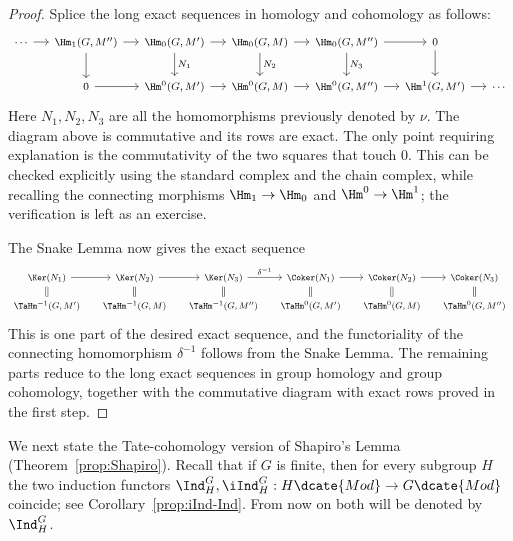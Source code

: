 \begin{proof}
	Splice the long exact sequences in homology and cohomology as follows:
	\[\begin{tikzcd}[column sep=small, every cell/.append style={font = \footnotesize}]
		\cdots \arrow[r] & \Hm_1(G, M'') \arrow[r] \arrow[d] & \Hm_0(G, M') \arrow[r] \arrow[d, "{N_1}"] & \Hm_0(G, M) \arrow[r] \arrow[d, "N_2"] & \Hm_0(G, M'') \arrow[r] \arrow[d, "N_3"] & 0 \arrow[d] & \\
		& 0 \arrow[r] & \Hm^0(G, M') \arrow[r] & \Hm^0(G, M) \arrow[r] & \Hm^0(G, M'') \arrow[r] & \Hm^1(G, M') \arrow[r] & \cdots
	\end{tikzcd}\]
	Here $N_1,N_2,N_3$ are all the homomorphisms previously denoted by
	$\nu$. The diagram above is commutative and its rows are exact. The only
	point requiring explanation is the commutativity of the two squares that
	touch $0$. This can be checked explicitly using the standard complex and
	the chain complex, while recalling the connecting morphisms
	$\Hm_1 \to \Hm_0$ and $\Hm^0 \to \Hm^1$; the verification is left as an
	exercise.

	The Snake Lemma now gives the exact sequence
	\[\begin{tikzcd}[row sep=small, column sep=small, every cell/.append style={font = \footnotesize}]
		\Ker(N_1) \arrow[r] & \Ker(N_2) \arrow[r] & \Ker(N_3) \arrow[r, "{\delta^{-1}}"] & \Coker(N_1) \arrow[r] & \Coker(N_2) \arrow[r] & \Coker(N_3) \\
		\TaHm^{-1}(G, M') \arrow[equal, u] & \TaHm^{-1}(G, M) \arrow[equal, u] & \TaHm^{-1}(G, M'') \arrow[equal, u] & \TaHm^0(G, M') \arrow[equal, u] & \TaHm^0(G, M) \arrow[equal, u] & \TaHm^0(G, M'') \arrow[equal, u]
	\end{tikzcd}\]
	This is one part of the desired exact sequence, and the functoriality of
	the connecting homomorphism $\delta^{-1}$ follows from the Snake Lemma.
	The remaining parts reduce to the long exact sequences in group homology
	and group cohomology, together with the commutative diagram with exact rows
	proved in the first step.
\end{proof}

We next state the Tate-cohomology version of Shapiro's Lemma
(Theorem~\ref{prop:Shapiro}). Recall that if $G$ is finite, then for every
subgroup $H$ the two induction functors
$\Ind^G_H,\iInd^G_H:H\dcate{Mod}\to G\dcate{Mod}$ coincide; see
Corollary~\ref{prop:iInd-Ind}. From now on both will be denoted by
$\Ind^G_H$.

